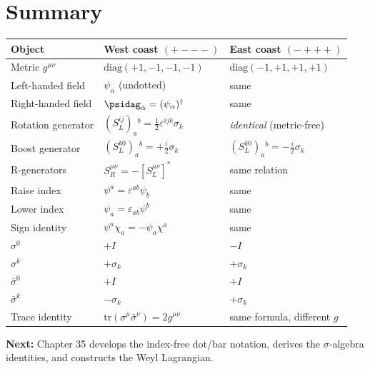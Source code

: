 
\section{Summary}

\begin{center}
\renewcommand{\arraystretch}{1.4}
\begin{tabular}{@{}lll@{}}
  \toprule
  Object & West coast $(+{-}{-}{-})$ & East coast $(-{+}{+}{+})$ \\
  \midrule
  Metric $g^{\mu\nu}$ & $\mathrm{diag}(+1,-1,-1,-1)$ & $\mathrm{diag}(-1,+1,+1,+1)$ \\
  Left-handed field & $\psi_\alpha$ (undotted) & same \\
  Right-handed field & $\psidag_{\dot\alpha} = (\psi_\alpha)^\dagger$ & same \\
  Rotation generator & $(S^{ij}_L)_a{}^b = \tfrac{1}{2}\varepsilon^{ijk}\sigma_k$ & \emph{identical} (metric-free) \\
  Boost generator & $(S^{k0}_L)_a{}^b = +\tfrac{i}{2}\sigma_k$ & $(S^{k0}_L)_a{}^b = -\tfrac{i}{2}\sigma_k$ \\
  R-generators & $S^{\mu\nu}_R = -[S^{\mu\nu}_L]^*$ & same relation \\
  Raise index & $\psi^a = \varepsilon^{ab}\psi_b$ & same \\
  Lower index & $\psi_a = \varepsilon_{ab}\psi^b$ & same \\
  Sign identity & $\psi^a\chi_a = -\psi_a\chi^a$ & same \\
  $\sigma^0$ & $+I$ & $-I$ \\
  $\sigma^k$ & $+\sigma_k$ & $+\sigma_k$ \\
  $\bar\sigma^0$ & $+I$ & $+I$ \\
  $\bar\sigma^k$ & $-\sigma_k$ & $+\sigma_k$ \\
  Trace identity & $\mathrm{tr}(\sigma^\mu\bar\sigma^\nu)=2g^{\mu\nu}$ & same formula, different $g$ \\
  \bottomrule
\end{tabular}
\end{center}

\bigskip
\noindent\textbf{Next:} Chapter 35 develops the index-free dot/bar notation,
derives the $\sigma$-algebra identities, and constructs the Weyl Lagrangian.
